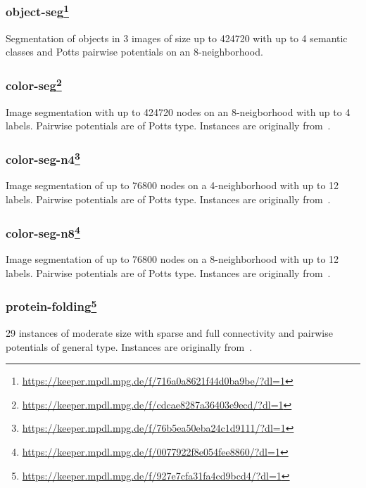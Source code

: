\subsubsection[object-seg]{object-seg\footnote{\url{https://keeper.mpdl.mpg.de/f/716a0a8621f44d0ba9be/?dl=1}}}
Segmentation of objects in 3 images of size up to 424720 with up to 4 semantic classes and Potts pairwise potentials on an 8-neighborhood.

\subsubsection[color-seg]{color-seg\footnote{\url{https://keeper.mpdl.mpg.de/f/cdcae8287a36403e9ecd/?dl=1}}}
Image segmentation with up to 424720 nodes on an 8-neigborhood with up to 4 labels. 
Pairwise potentials are of Potts type.
Instances are originally from~\cite{alahari2009dynamic}.

\subsubsection[color-seg-n4]{color-seg-n4\footnote{\url{https://keeper.mpdl.mpg.de/f/76b5ea50eba24c1d9111/?dl=1}}}
Image segmentation of up to 76800 nodes on a 4-neighborhood with up to 12 labels. 
Pairwise potentials are of Potts type.
Instances are originally from~\cite{lellmann2011continuous}.

\subsubsection[color-seg-n8]{color-seg-n8\footnote{\url{https://keeper.mpdl.mpg.de/f/0077922f8e054fee8860/?dl=1}}}
Image segmentation of up to 76800 nodes on a 8-neighborhood with up to 12 labels. 
Pairwise potentials are of Potts type.
Instances are originally from~\cite{lellmann2011continuous}.

\subsubsection[protein-folding]{protein-folding\footnote{\url{https://keeper.mpdl.mpg.de/f/927e7cfa31fa4cd9bcd4/?dl=1}}}
29 instances of moderate size with sparse and full connectivity and pairwise potentials of general type.
Instances are originally from~\cite{jaimovich2006towards,elidan2011probabilistic}.





